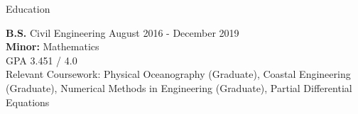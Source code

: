 \documentclass{resume} %
\begin{document}
\vspace{-85 pt}


\begin{rSection}{Education}

{\bf B.S.} Civil Engineering \hfill {August 2016 - December 2019}
\\ 
{\bf Minor:} Mathematics
\\
GPA 3.451 / 4.0 
\\
Relevant Coursework: Physical Oceanography (Graduate), Coastal Engineering (Graduate), Numerical Methods in Engineering (Graduate), Partial Differential Equations

\end{rSection}
\end{document}
